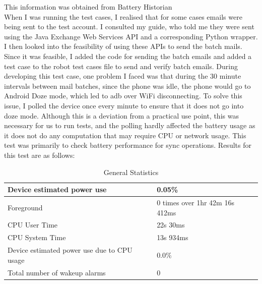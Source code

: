This information was obtained from Battery Historian\\

When I was running the test cases, I realised that for some cases emails were being sent to the test account. I consulted my guide, who told me they were sent using the Java Exchange Web Services API and a corresponding Python wrapper. I then looked into the feasibility of using these APIs to send the batch mails. Since it was feasible, I added the code for sending the batch emails and added a test case to the robot test cases file to send and verify batch emails. During developing this test case, one problem I faced was that during the 30 minute intervals between mail batches, since the phone was idle, the phone would go to Android Doze mode, which led to adb over WiFi disconnecting. To solve this issue, I polled the device once every minute to ensure that it does not go into doze mode. Although this is a deviation from a practical use point, this was necessary for us to run tests, and the polling hardly affected the battery usage as it does not do any computation that may require CPU or network usage. This test was primarily to check battery performance for sync operations. Results for this test are as follows:

\begin{table}[!h]
\begin{center}
\caption{General Statistics}
\label{my-label}
\begin{tabular}{|P{8cm}|P{6.5cm}|}
\hline
Device estimated power use                  & 0.05\%                      \\ \hline
Foreground                                  & 0 times over 1hr 42m 16s 412ms \\ \hline
CPU User Time                               & 22s 30ms                 \\ \hline
CPU System Time                             & 13s 934ms                \\ \hline
Device estimated power use due to CPU usage & 0.0\%                       \\ \hline
Total number of wakeup alarms               & 0     \\    \hline                
\end{tabular}
\end{center}
\end{table}


